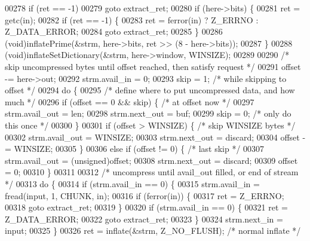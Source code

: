 \begin{DoxyCode}
00278     \textcolor{keywordflow}{if} (ret == -1)
00279         \textcolor{keywordflow}{goto} extract\_ret;
00280     \textcolor{keywordflow}{if} (here->bits) \{
00281         ret = getc(in);
00282         \textcolor{keywordflow}{if} (ret == -1) \{
00283             ret = ferror(in) ? Z\_ERRNO : Z\_DATA\_ERROR;
00284             \textcolor{keywordflow}{goto} extract\_ret;
00285         \}
00286         (void)inflatePrime(&strm, here->bits, ret >> (8 - here->bits));
00287     \}
00288     (void)inflateSetDictionary(&strm, here->window, WINSIZE);
00289 
00290     \textcolor{comment}{/* skip uncompressed bytes until offset reached, then satisfy request */}
00291     offset -= here->out;
00292     strm.avail\_in = 0;
00293     skip = 1;                               \textcolor{comment}{/* while skipping to offset */}
00294     \textcolor{keywordflow}{do} \{
00295         \textcolor{comment}{/* define where to put uncompressed data, and how much */}
00296         \textcolor{keywordflow}{if} (offset == 0 && skip) \{          \textcolor{comment}{/* at offset now */}
00297             strm.avail\_out = len;
00298             strm.next\_out = buf;
00299             skip = 0;                       \textcolor{comment}{/* only do this once */}
00300         \}
00301         \textcolor{keywordflow}{if} (offset > WINSIZE) \{             \textcolor{comment}{/* skip WINSIZE bytes */}
00302             strm.avail\_out = WINSIZE;
00303             strm.next\_out = discard;
00304             offset -= WINSIZE;
00305         \}
00306         \textcolor{keywordflow}{else} \textcolor{keywordflow}{if} (offset != 0) \{             \textcolor{comment}{/* last skip */}
00307             strm.avail\_out = (unsigned)offset;
00308             strm.next\_out = discard;
00309             offset = 0;
00310         \}
00311 
00312         \textcolor{comment}{/* uncompress until avail\_out filled, or end of stream */}
00313         \textcolor{keywordflow}{do} \{
00314             \textcolor{keywordflow}{if} (strm.avail\_in == 0) \{
00315                 strm.avail\_in = fread(input, 1, CHUNK, in);
00316                 \textcolor{keywordflow}{if} (ferror(in)) \{
00317                     ret = Z\_ERRNO;
00318                     \textcolor{keywordflow}{goto} extract\_ret;
00319                 \}
00320                 \textcolor{keywordflow}{if} (strm.avail\_in == 0) \{
00321                     ret = Z\_DATA\_ERROR;
00322                     \textcolor{keywordflow}{goto} extract\_ret;
00323                 \}
00324                 strm.next\_in = input;
00325             \}
00326             ret = inflate(&strm, Z\_NO\_FLUSH);       \textcolor{comment}{/* normal inflate */}

\end{DoxyCode}
